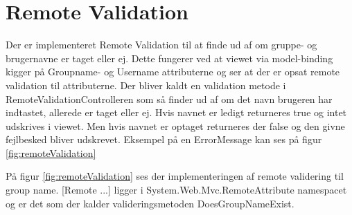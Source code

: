 \section{Remote Validation}
Der er implementeret Remote Validation til at finde ud af om gruppe- og brugernavne er taget eller ej. Dette fungerer ved at viewet via model-binding kigger på Groupname- og Username attributerne og ser at der er opsat remote validation til attributerne. Der bliver kaldt en validation metode i RemoteValidationControlleren som så finder ud af om det navn brugeren har indtastet, allerede er taget eller ej. Hvis navnet er ledigt returneres true og intet udskrives i viewet. Men hvis navnet er optaget returneres der false og den givne fejlbesked bliver udskrevet. Eksempel på en ErrorMessage kan ses på figur \ref{fig:remoteValidation}


På figur \ref{fig:remoteValidation} ses der implementeringen af remote validering til group name. [Remote ...] ligger i System.Web.Mvc.RemoteAttribute namespacet og er det som der kalder valideringsmetoden DoesGroupNameExist.